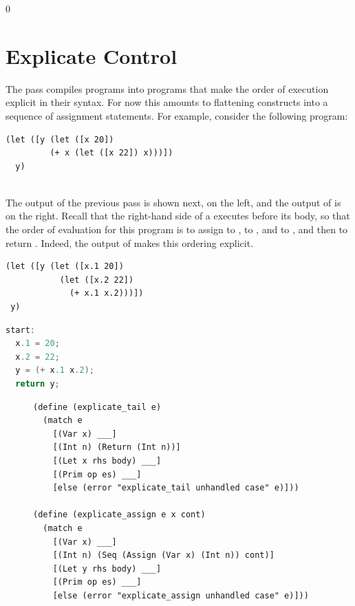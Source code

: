 \documentclass[7x10]{TimesAPriori_MIT}%
\def\racketEd{0}
\def\edition{1}
\numberwithin{theorem}{chapter}
\numberwithin{definition}{chapter}
\numberwithin{equation}{chapter}
\begin{document}
{\if\edition\racketEd  
\section{Explicate Control}
\label{sec:explicate-control-Lvar}

The  pass compiles \LangVar{} programs into \LangCVar{}
programs that make the order of execution explicit in their
syntax. For now this amounts to flattening  constructs into a
sequence of assignment statements. For example, consider the following
\LangVar{} program:\\
\begin{minipage}{0.96\textwidth}
\begin{lstlisting}
(let ([y (let ([x 20])
         (+ x (let ([x 22]) x)))])
  y)
\end{lstlisting}
\end{minipage}\\
%
The output of the previous pass is shown next, on the left, and the
output of  is on the right. Recall that the
right-hand side of a  executes before its body, so that the order
of evaluation for this program is to assign  to ,
 to , and  to , and then to
return . Indeed, the output of  makes
this ordering explicit.
\begin{transformation}
\begin{lstlisting}
(let ([y (let ([x.1 20]) 
           (let ([x.2 22])
             (+ x.1 x.2)))])
 y)
\end{lstlisting}
\compilesto
\begin{lstlisting}[language=C]
start:
  x.1 = 20;
  x.2 = 22;
  y = (+ x.1 x.2);
  return y;
\end{lstlisting}
\end{transformation}

\begin{figure}[tbp]
\begin{tcolorbox}[colback=white]
\begin{lstlisting}
(define (explicate_tail e)
  (match e
    [(Var x) ___]
    [(Int n) (Return (Int n))]
    [(Let x rhs body) ___]
    [(Prim op es) ___]
    [else (error "explicate_tail unhandled case" e)]))

(define (explicate_assign e x cont)
  (match e
    [(Var x) ___]
    [(Int n) (Seq (Assign (Var x) (Int n)) cont)]
    [(Let y rhs body) ___]
    [(Prim op es) ___]
    [else (error "explicate_assign unhandled case" e)]))


\end{lstlisting}
\end{tcolorbox}
\end{figure}}
\end{document}
